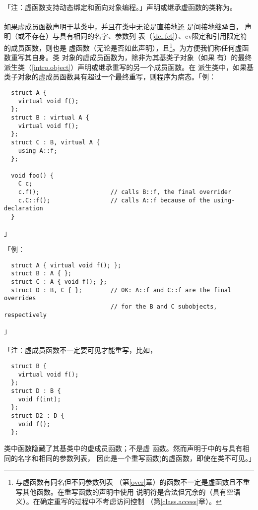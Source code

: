 \paragraph{}
「注：虚函数支持动态绑定和面向对象编程。」声明或继承虚函数的类称为。

\paragraph{}
如果虚成员函数声明于基类中，并且在类中无论是直接地还
是间接地继承自， 声明（或不存在）与具有相同的名字、参数列
表（\ref{dcl.fct}）、cv限定和引用限定符的成员函数，则也是
虚函数（无论是否如此声明），且\footnote{与虚函数有同名但不同参数列表
（第\ref{over}章）的函数不一定是虚函数且不重写其他函数。在重写函数的声明中使用
说明符是合法但冗余的（具有空语义）。在确定重写的过程中不考虑访问控制
（第\ref{class.access}章）。}。为方便我们称任何虚函数重写其自身。类
对象的虚成员函数为，除非为其基类子对象（如果
有）的最终派生类（\ref{intro.object}）声明或继承重写的另一个成员函数。在
派生类中，如果基类子对象的虚成员函数具有超过一个最终重写，则程序为病态。「例：
\begin{lstlisting}
  struct A {
    virtual void f();
  };
  struct B : virtual A {
    virtual void f();
  };
  struct C : B, virtual A {
    using A::f;
  };

  void foo() {
    C c;
    c.f();                    // calls B::f, the final overrider
    c.C::f();                 // calls A::f because of the using-declaration
  }
\end{lstlisting}」

「例：
\begin{lstlisting}
  struct A { virtual void f(); };
  struct B : A { };
  struct C : A { void f(); };
  struct D : B, C { };        // OK: A::f and C::f are the final overrides
                              // for the B and C subobjects, respectively
\end{lstlisting}」

\paragraph{}
「注：虚成员函数不一定要可见才能重写，比如，
\begin{lstlisting}
  struct B {
    virtual void f();
  };
  struct D : B {
    void f(int);
  };
  struct D2 : D {
    void f();
  };
\end{lstlisting}
类中函数隐藏了其基类中的虚成员函数；不是虚
函数。然而声明于中的与具有相同的名字和相同的参数列表，
因此是一个重写函数)的虚函数，即使在类不可见。」

